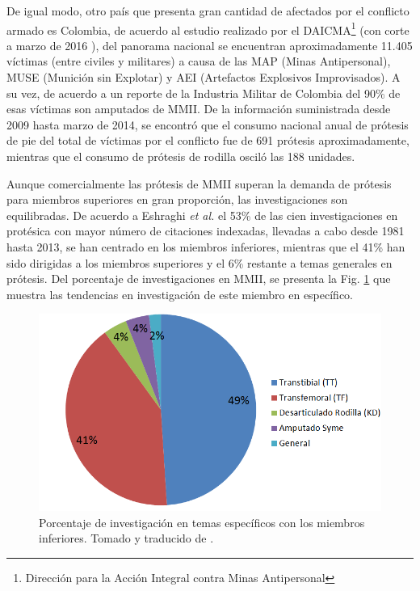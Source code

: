 \documentclass[12pt,english]{article}
\begin{document}
De igual modo, otro país que presenta gran cantidad de afectados por
el conflicto armado es Colombia, de acuerdo al estudio realizado por
el DAICMA\footnote{Dirección para la Acción Integral contra Minas Antipersonal}
(con corte a marzo de 2016 \cite{PAICMA}), del panorama nacional
se encuentran aproximadamente 11.405 víctimas (entre civiles y militares)
a causa de las MAP (Minas Antipersonal), MUSE (Munición sin Explotar)
y AEI (Artefactos Explosivos Improvisados). A su vez, de acuerdo a
un reporte de la Industria Militar de Colombia \cite{Prieto2014}
del 90\% de esas víctimas son amputados de MMII. De la información
suministrada desde 2009 hasta marzo de 2014, se encontró que el consumo
nacional anual de prótesis de pie del total de víctimas por el conflicto
fue de 691 prótesis aproximadamente, mientras que el consumo de prótesis
de rodilla osciló las 188 unidades.

Aunque comercialmente las prótesis de MMII superan la demanda de prótesis
para miembros superiores en gran proporción, las investigaciones son
equilibradas. De acuerdo a Eshraghi \emph{et al.}\cite{Eshraghi2013}
el 53\% de las cien investigaciones en protésica con mayor número
de citaciones indexadas, llevadas a cabo desde 1981 hasta 2013, se
han centrado en los miembros inferiores, mientras que el 41\% han
sido dirigidas a los miembros superiores y el 6\% restante a temas
generales en prótesis. Del porcentaje de investigaciones en MMII,
se presenta la Fig. \ref{fig:Porcentaje-de-investigaci=0000F3n} que
muestra las tendencias en investigación de este miembro en específico.

\begin{figure}
\begin{centering}
\includegraphics[scale=0.45]{estapies}
\par\end{centering}

\caption{\label{fig:Porcentaje-de-investigaci=0000F3n}Porcentaje de investigación
en temas específicos con los miembros inferiores. Tomado y traducido
de \cite{Eshraghi2013}. }
\end{figure}
\end{document}
